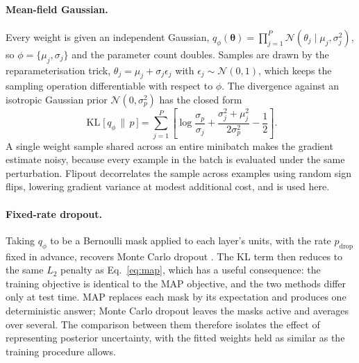 \documentclass{article}
\begin{document}
\paragraph{Mean-field Gaussian.}
Every weight is given an independent Gaussian,
$q_\phi(\boldsymbol{\theta}) = \prod_{j=1}^{P} \mathcal{N}(\theta_j \mid \mu_j, \sigma_j^2)$,
so $\phi = \{\mu_j, \sigma_j\}$ and the parameter count doubles. Samples are
drawn by the reparameterisation trick, $\theta_j = \mu_j + \sigma_j \epsilon_j$
with $\epsilon_j \sim \mathcal{N}(0,1)$, which keeps the sampling operation
differentiable with respect to $\phi$. The divergence against an isotropic
Gaussian prior $\mathcal{N}(0, \sigma_p^2)$ has the closed form
\begin{equation}
\operatorname{KL}\!\big[\, q_\phi \,\|\, p \,\big]
= \sum_{j=1}^{P} \left[
  \log \frac{\sigma_p}{\sigma_j}
  + \frac{\sigma_j^2 + \mu_j^2}{2\sigma_p^2}
  - \frac{1}{2} \right].
\label{eq:gaussian-kl}
\end{equation}
A single weight sample shared across an entire minibatch makes the gradient
estimate noisy, because every example in the batch is evaluated under the same
perturbation. Flipout \citep{wen2018} decorrelates the sample across examples
using random sign flips, lowering gradient variance at modest additional cost,
and is used here.

\paragraph{Fixed-rate dropout.}
Taking $q_\phi$ to be a Bernoulli mask applied to each layer's units, with the
rate $p_{\text{drop}}$ fixed in advance, recovers Monte Carlo dropout
\citep{gal2016}. The KL term then reduces to the same $L_2$ penalty as
Eq.~\eqref{eq:map}, which has a useful consequence: the training objective is
identical to the MAP objective, and the two methods differ only at test time.
MAP replaces each mask by its expectation and produces one deterministic answer;
Monte Carlo dropout leaves the masks active and averages over several. The
comparison between them therefore isolates the effect of representing posterior
uncertainty, with the fitted weights held as similar as the training procedure
allows.
\end{document}
